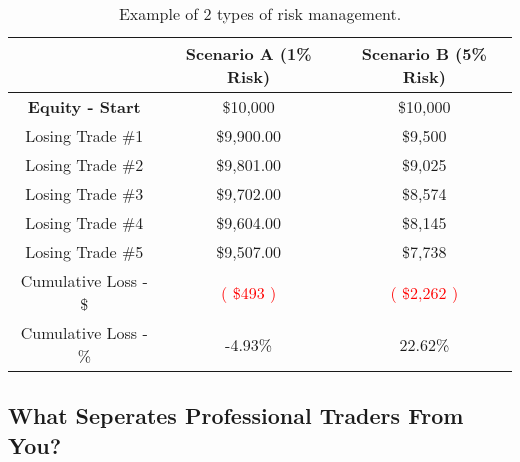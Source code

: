 \documentclass[10pt]{article}           %
\begin{document}
\renewcommand{\arraystretch}{1.5} %
\setlength{\tabcolsep}{10pt} %

\begin{table}[h]
\centering
\begin{tabular}{|c|c|c|}
\cline{2-3}
  \multicolumn{1}{c|}{} & \textbf{Scenario A (1\% Risk)} & \textbf{Scenario B (5\% Risk)} \\
\hline
\textbf{Equity - Start} & \$10,000 & \$10,000 \\
\hline
Losing Trade \#1 & \$9,900.00 & \$9,500 \\
\hline                     
Losing Trade \#2 & \$9,801.00 & \$9,025 \\
\hline                     
Losing Trade \#3 & \$9,702.00 & \$8,574 \\
\hline                     
Losing Trade \#4 & \$9,604.00 & \$8,145 \\
\hline                     
Losing Trade \#5 & \$9,507.00 & \$7,738 \\
\hline
  Cumulative Loss - \$ & \textcolor{red}{( \$493 )} & \textcolor{red}{( \$2,262 )} \\
\hline
Cumulative Loss - \% & -4.93\% & 22.62\% \\
\hline
\end{tabular}
  \caption{\small Example of 2 types of risk management.}
  \label{tab:risk-management}
\end{table}


\subsection{\small What Seperates Professional Traders From You?}
\vspace{0.1cm}
\end{document}

